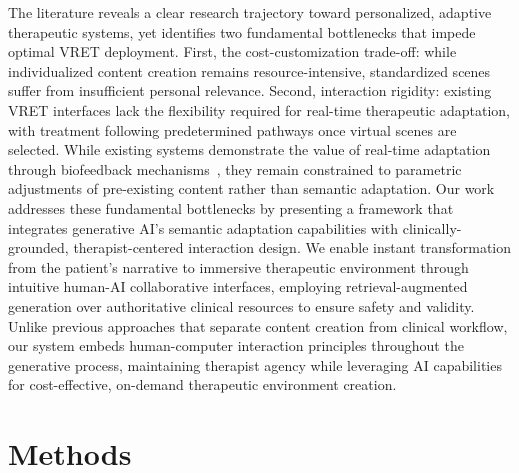 \documentclass[]{interact}
\begin{document}
The literature reveals a clear research trajectory toward personalized, adaptive therapeutic systems, yet identifies two fundamental bottlenecks that impede optimal VRET deployment. First, the cost-customization trade-off: while individualized content creation remains resource-intensive, standardized scenes suffer from insufficient personal relevance. Second, interaction rigidity: existing VRET interfaces lack the flexibility required for real-time therapeutic adaptation, with treatment following predetermined pathways once virtual scenes are selected. While existing systems demonstrate the value of real-time adaptation through biofeedback mechanisms~\cite{zelis2025adaptive}, they remain constrained to parametric adjustments of pre-existing content rather than semantic adaptation. Our work addresses these fundamental bottlenecks by presenting a framework that integrates generative AI's semantic adaptation capabilities with clinically-grounded, therapist-centered interaction design. We enable instant transformation from the patient's narrative to immersive therapeutic environment through intuitive human-AI collaborative interfaces, employing retrieval-augmented generation over authoritative clinical resources to ensure safety and validity. Unlike previous approaches that separate content creation from clinical workflow, our system embeds human-computer interaction principles throughout the generative process, maintaining therapist agency while leveraging AI capabilities for cost-effective, on-demand therapeutic environment creation.


\section{Methods}
\end{document}
